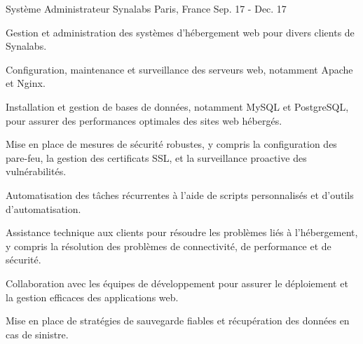 \begin{cventries}
        \cventry
        {Système Administrateur} %
        {Synalabs} %
        {Paris, France} %
        {Sep. 17 - Dec. 17 } %
        {
          \begin{cvitems} %
            \item {Gestion et administration des systèmes d'hébergement web pour divers clients de Synalabs.}
            \item {Configuration, maintenance et surveillance des serveurs web, notamment Apache et Nginx.}
            \item {Installation et gestion de bases de données, notamment MySQL et PostgreSQL, pour assurer des performances optimales des sites web hébergés.}
            \item {Mise en place de mesures de sécurité robustes, y compris la configuration des pare-feu, la gestion des certificats SSL, et la surveillance proactive des vulnérabilités.}
            \item {Automatisation des tâches récurrentes à l'aide de scripts personnalisés et d'outils d'automatisation.}
            \item {Assistance technique aux clients pour résoudre les problèmes liés à l'hébergement, y compris la résolution des problèmes de connectivité, de performance et de sécurité.}
            \item {Collaboration avec les équipes de développement pour assurer le déploiement et la gestion efficaces des applications web.}
            \item {Mise en place de stratégies de sauvegarde fiables et récupération des données en cas de sinistre.}
          \end{cvitems}
        }


\end{cventries}
